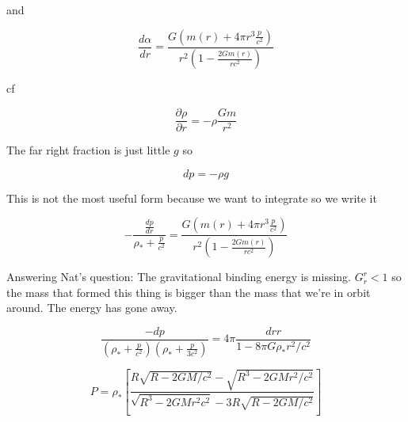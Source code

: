 \documentclass[12pt]{extarticle}
\begin{document}
and 

$$ \frac{d\alpha}{dr} = \frac{G \left( m(r) + 4\pi r^3 \frac{p}{c^2}\right)}{r^2 \left(1 - \frac{2Gm(r)}{rc^2}\right)}$$

cf

$$\frac{\partial\rho}{\partial r} = -\rho \frac{Gm}{r^2}$$

The far right fraction is just little $g$ so

$$dp = -\rho g $$

This is not the most useful form because we want to integrate so we write it

$$ -\frac{\frac{dp}{dr}}{\rho_* + \frac{p}{c^2}} = \frac{G \left( m(r) + 4\pi r^3 \frac{p}{c^2}\right)}{r^2 \left(1 - \frac{2Gm(r)}{rc^2}\right)}$$

Answering Nat's question:
The gravitational binding energy is missing. $G_r^r < 1$ so the mass that formed this thing is bigger than the mass that we're in orbit around. The energy has gone away.

$$\frac{ -dp}{(\rho_* + \frac{p}{c^2})(\rho_* +\frac{p}{3c^2})} = 4\pi\frac{dr r}{1-8\pi G\rho_*r^2/c^2}$$

$$P = \rho_* \left[ \frac{R\sqrt{R-2GM/c^2}-\sqrt{R^3-2GMr^2/c^2}}{\sqrt{R^3-2GMr^2c^2}-3R\sqrt{R-2GM/c^2}} \right]$$
\end{document}
